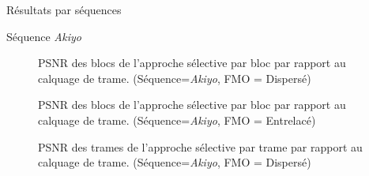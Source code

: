 \begin{section}{Résultats par séquences}
\begin{subsection}{Séquence \textit{Akiyo}}
\begin{figure}  \caption[]{PSNR des blocs de l'approche sélective par bloc par rapport au
calquage de trame. (Séquence=\textit{Akiyo}, FMO = Dispersé)}
\label{fig-ParSequenceDispersed1}
\end{figure}

\begin{figure}  \caption[]{PSNR des blocs de l'approche sélective par bloc par rapport au
calquage de trame. (Séquence=\textit{Akiyo}, FMO = Entrelacé)}
\label{fig-ParSequenceInterleaved1}
\end{figure}

\begin{figure}  \caption[]{PSNR des trames de l'approche sélective par trame par rapport au
calquage de trame. (Séquence=\textit{Akiyo}, FMO = Dispersé)}
\label{fig-ParSequenceFrameDispersed1}
\end{figure}


\end{subsection}
\end{section}
